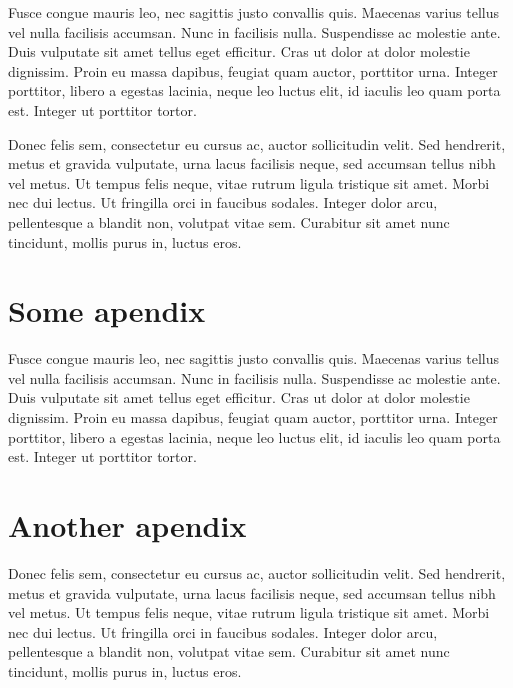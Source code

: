 \documentclass{UoYCSproject}
\begin{document}
Fusce congue mauris leo, nec sagittis justo convallis quis. Maecenas
varius tellus vel nulla facilisis accumsan. Nunc in facilisis
nulla. Suspendisse ac molestie ante. Duis vulputate sit amet tellus
eget efficitur. Cras ut dolor at dolor molestie dignissim. Proin eu
massa dapibus, feugiat quam auctor, porttitor urna. Integer porttitor,
libero a egestas lacinia, neque leo luctus elit, id iaculis leo quam
porta est. Integer ut porttitor tortor.

Donec felis sem, consectetur eu cursus ac, auctor sollicitudin
velit. Sed hendrerit, metus et gravida vulputate, urna lacus facilisis
neque, sed accumsan tellus nibh vel metus. Ut tempus felis neque,
vitae rutrum ligula tristique sit amet. Morbi nec dui lectus. Ut
fringilla orci in faucibus sodales. Integer dolor arcu, pellentesque a
blandit non, volutpat vitae sem. Curabitur sit amet nunc tincidunt,
mollis purus in, luctus eros.

\appendix
\chapter{Some apendix}
Fusce congue mauris leo, nec sagittis justo convallis quis. Maecenas
varius tellus vel nulla facilisis accumsan. Nunc in facilisis
nulla. Suspendisse ac molestie ante. Duis vulputate sit amet tellus
eget efficitur. Cras ut dolor at dolor molestie dignissim. Proin eu
massa dapibus, feugiat quam auctor, porttitor urna. Integer porttitor,
libero a egestas lacinia, neque leo luctus elit, id iaculis leo quam
porta est. Integer ut porttitor tortor.

\chapter{Another apendix}
Donec felis sem, consectetur eu cursus ac, auctor sollicitudin
velit. Sed hendrerit, metus et gravida vulputate, urna lacus facilisis
neque, sed accumsan tellus nibh vel metus. Ut tempus felis neque,
vitae rutrum ligula tristique sit amet. Morbi nec dui lectus. Ut
fringilla orci in faucibus sodales. Integer dolor arcu, pellentesque a
blandit non, volutpat vitae sem. Curabitur sit amet nunc tincidunt,
mollis purus in, luctus eros.


\printbibliography
\end{document}
